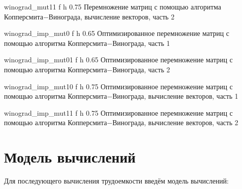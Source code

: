 {winograd_mut11} %
{f} %
{h} %
{0.75\textwidth} %
{Перемножение матриц с помощью алгоритма Копперсмита$-$Винограда, вычисление векторов, часть 2} %
\clearpage

{winograd_imp_mut0} %
{f} %
{h} %
{0.65\textwidth} %
{Оптимизированное перемножение матриц с помощью алгоритма Копперсмита$-$Винограда, часть 1} %
\clearpage

{winograd_imp_mut01} %
{f} %
{h} %
{0.65\textwidth} %
{Оптимизированное перемножение матриц с помощью алгоритма Копперсмита$-$Винограда, часть 2} %
\clearpage

{winograd_imp_mut10} %
{f} %
{h} %
{0.75\textwidth} %
{Оптимизированное перемножение матриц с помощью алгоритма Копперсмита$-$Винограда, вычисление векторов, часть 1} %
\clearpage

{winograd_imp_mut11} %
{f} %
{h} %
{0.75\textwidth} %
{Оптимизированное перемножение матриц с помощью алгоритма Копперсмита$-$Винограда, вычисление векторов, часть 2} %
\clearpage

\section{Модель вычислений}

Для последующего вычисления трудоемкости введём модель вычислений:

